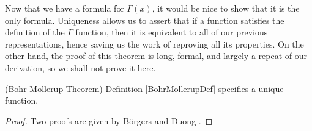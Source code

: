 Now that we have a formula for $\Gamma(x)$, it would be nice to show that it is the only formula.
Uniqueness allows us to assert that if a function satisfies the definition of the $\Gamma$ function, then it is equivalent to all of our previous representations, hence saving us the work of reproving all its properties.
On the other hand, the proof of this theorem is long, formal, and largely a repeat of our derivation, so we shall not prove it here.

\begin{thm}
(Bohr-Mollerup Theorem) Definition \ref{BohrMollerupDef} specifies a unique function.
\end{thm}

\begin{proof}
Two proofs are given by B\"{o}rgers and Duong \cite{uniquenessPF}\cite{uniquenessPF2}.
\end{proof}

